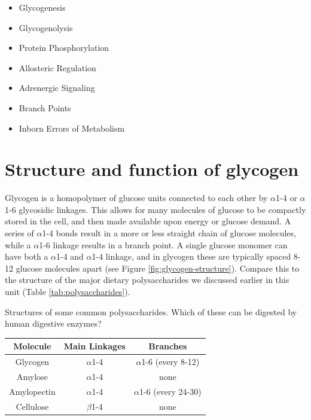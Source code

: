 \documentclass{tufte-handout}
\begin{document}
\begin{itemize}
	\item Glycogenesis
	\item Glycogenolysis
	\item Protein Phosphorylation
	\item Allosteric Regulation
	\item Adrenergic Signaling
	\item Branch Points
	\item Inborn Errors of Metabolism
\end{itemize}

\section{Structure and function of glycogen}

Glycogen is a homopolymer of glucose units connected to each other by $\alpha$1-4 or $\alpha$1-6 glycosidic linkages.  This allows for many molecules of glucose to be compactly stored in the cell, and then made available upon energy or glucose demand.  A series of $\alpha$1-4 bonds result in a more or less straight chain of glucose molecules, while a $\alpha$1-6 linkage results in a branch point.  A single glucose monomer can have both a $\alpha$1-4 and $\alpha$1-4 linkage, and in glycogen these are typically spaced 8-12 glucose molecules apart (see Figure \ref{fig:glycogen-structure}).  Compare this to the structure of the major dietary polysaccharides we discussed earlier in this unit (Table \ref{tab:polysaccharides}).

\begin{margintable}
\centering
\caption{Structures of some common polysaccharides.  Which of these can be digested by human digestive enzymes?}
\label{tab:polysaccharides}
\begin{tabular}{ccc}
\hline
\textbf {Molecule} & \textbf{Main Linkages} & \textbf{Branches}   \\
\hline
Glycogen & $\alpha$1-4 & $\alpha$1-6 (every 8-12) \\
Amylose & $\alpha$1-4 & none \\
Amylopectin & $\alpha$1-4 & $\alpha$1-6 (every 24-30) \\
Cellulose & $\beta$1-4 & none \\
\hline
\end{tabular}
\end{margintable}
\end{document}
